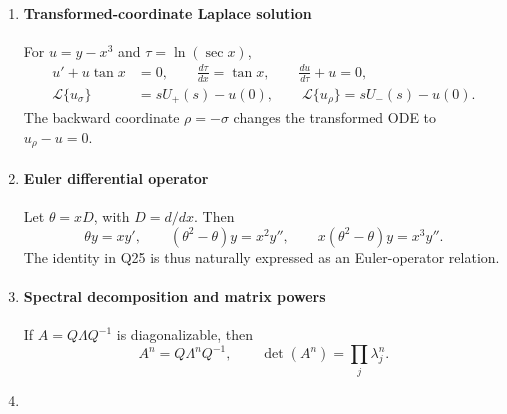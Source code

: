 \begin{enumerate}[leftmargin=0pt,itemsep=6pt]
\paragraph*{Affine line--plane constraints}
A line is $r=A+td$ and a plane is $n^Tr=c$. Their intersection is obtained from the augmented affine system
\[
\begin{pmatrix}I&-d\\n^T&0\end{pmatrix}
\begin{pmatrix}r\\t\end{pmatrix}
=
\begin{pmatrix}A\\c\end{pmatrix}.
\]
Rank equality of the coefficient and augmented matrices determines consistency; full column rank gives a unique intersection.
\label{eq:line-point-direction}
\addtocounter{enumi}{8}
\item
\paragraph*{Transformed-coordinate Laplace solution}
For $u=y-x^3$ and $\tau=\ln(\sec x)$,
\begin{align}
u'+u\tan x&=0,\qquad \frac{d\tau}{dx}=\tan x,\qquad
\frac{du}{d\tau}+u=0,
\label{eq:laplace-24}\\
\mathcal L\{u_\sigma\}&=sU_+(s)-u(0),\qquad
\mathcal L\{u_\rho\}=sU_-(s)-u(0).
\end{align}
The backward coordinate $\rho=-\sigma$ changes the transformed ODE to $u_\rho-u=0$.
\item
\paragraph*{Euler differential operator}
Let $\theta=xD$, with $D=d/dx$. Then
\[
\theta y=xy',\qquad
(\theta^2-\theta)y=x^2y'',\qquad
x(\theta^2-\theta)y=x^3y''.
\]
The identity in Q25 is thus naturally expressed as an Euler-operator relation.
\label{eq:log-derivative-25}
\addtocounter{enumi}{2}
\item
\paragraph*{Spectral decomposition and matrix powers}
If $A=Q\Lambda Q^{-1}$ is diagonalizable, then
\[
A^n=Q\Lambda^nQ^{-1},\qquad
\det(A^n)=\prod_j\lambda_j^n.
\]
\label{eq:det-power}
\addtocounter{enumi}{1}
\item

\end{enumerate}
